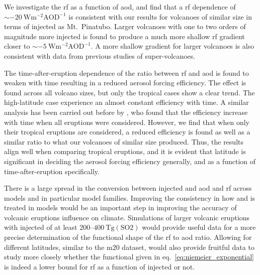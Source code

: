 \documentclass{ametsocV6.1}
\newcommand{\iso}[1][i]{{#1}njected \ce{SO2}}
\begin{document}
We investigate the \gls{rf} as a function of \gls{aod}, and find that a \gls{rf}
dependence of \(\sim\SI{-20}{\watt\metre^{-2}\mathrm{AOD}^{-1}}\) is consistent with our
results for volcanoes of similar size in terms of \iso{} as Mt.\ Pinatubo. Larger
volcanoes with one to two orders of magnitude more \iso{} is found to produce a much
more shallow \gls{rf} gradient closer to \(\sim
\SI{-5}{\watt\metre^{-2}\mathrm{AOD}^{-1}}\). A more shallow gradient for larger
volcanoes is also consistent with data from previous studies of super-volcanoes.

The time-after-eruption dependence of the ratio between \gls{rf} and \gls{aod} is found
to weaken with time resulting in a reduced aerosol forcing efficiency. The effect is
found across all volcano sizes, but only the tropical cases show a clear trend. The
high-latitude case experience an almost constant efficiency with time. A similar
analysis has been carried out before by \citet{marshall2020}, who found that the
efficiency increase with time when all eruptions were considered. However, we find that
when only their tropical eruptions are considered, a reduced efficiency is found as well
as a similar ratio to what our volcanoes of similar size produced. Thus, the results
align well when comparing tropical eruptions, and it is evident that latitude is
significant in deciding the aerosol forcing efficiency generally, and as a function of
time-after-eruption specifically.

There is a large spread in the conversion between \iso{} and \gls{aod} and \gls{rf}
across models and in particular model families. Improving the consistency in how
 and  is treated in models would be an important step in improving the
accuracy of volcanic eruptions influence on climate. Simulations of larger volcanic
eruptions with \iso{} of at least \(200\)--\(\SI{400}{\tera\gram(\mathrm{SO2})}\) would
provide useful data for a more precise determination of the functional shape of the
\gls{rf} to \gls{aod} ratio. Allowing for different latitudes, similar to the \gls{m20}
dataset, would also provide fruitful data to study more closely whether the functional
given in eq.~\ref{eq:niemeier_exponential} is indeed a lower bound for \gls{rf} as a
function of \iso{} or not.

\clearpage
\acknowledgments{}
\end{document}
